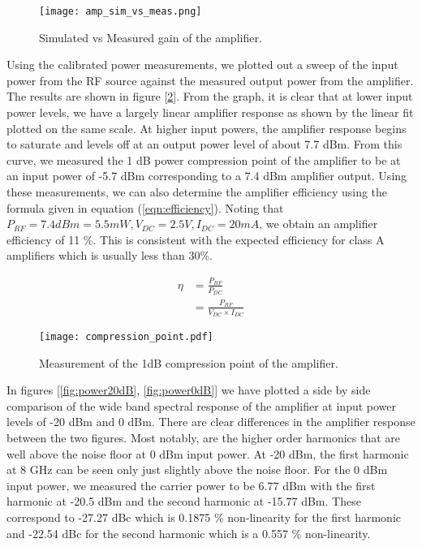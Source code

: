 \documentclass{article}
\begin{document}
\begin{figure}[!htbp]
    \centering
    \texttt{[image: amp\_sim\_vs\_meas.png]}
    \caption{Simulated vs Measured gain of the amplifier.}
    \label{fig:ampsimvsmeas}
\end{figure}

Using the calibrated power measurements, we plotted out a sweep of the input power from the RF source against the measured output power from the amplifier. The results are shown in figure [\ref{fig:amp1dB}]. From the graph, it is clear that at lower input power levels, we have a largely linear amplifier response as shown by the linear fit plotted on the same scale. At higher input powers, the amplifier response begins to saturate and levels off at an output power level of about 7.7 dBm. From this curve, we measured the 1 dB power compression point of the amplifier to be at an input power of -5.7 dBm corresponding to a 7.4 dBm amplifier output. Using these measurements, we can also determine the amplifier efficiency using the formula given in equation (\ref{eqn:efficiency}). Noting that $P_{RF} = 7.4 dBm = 5.5 mW, V_{DC} = 2.5 V, I_{DC} = 20 mA$, we obtain an amplifier efficiency of 11 \%. This is consistent with the expected efficiency for class A amplifiers which is usually less than 30\%.

\begin{align}
    \eta &= \frac{P_{RF}}{P_{DC}} \\
        &= \frac{P_{RF}}{V_{DC} \times I_{DC}}
    \label{eqn:efficiency}
\end{align}

\begin{figure}[!htbp]
    \centering
    \texttt{[image: compression\_point.pdf]}
    \caption{Measurement of the 1dB compression point of the amplifier.}
    \label{fig:amp1dB}
\end{figure}

In figures [\ref{fig:power20dB}, \ref{fig:power0dB}] we have plotted a side by side comparison of the wide band spectral response of the amplifier at input power levels of -20 dBm and 0 dBm. There are clear differences in the amplifier response between the two figures. Most notably, are the higher order harmonics that are well above the noise floor at 0 dBm input power. At -20 dBm, the first harmonic at 8 GHz can be seen only just slightly above the noise floor. For the 0 dBm input power, we measured the carrier power to be 6.77 dBm with the first harmonic at -20.5 dBm and the second harmonic at -15.77 dBm. These correspond to -27.27 dBc which is 0.1875 \% non-linearity for the first harmonic and  -22.54 dBc for the second harmonic which is a 0.557 \% non-linearity. 
\end{document}
